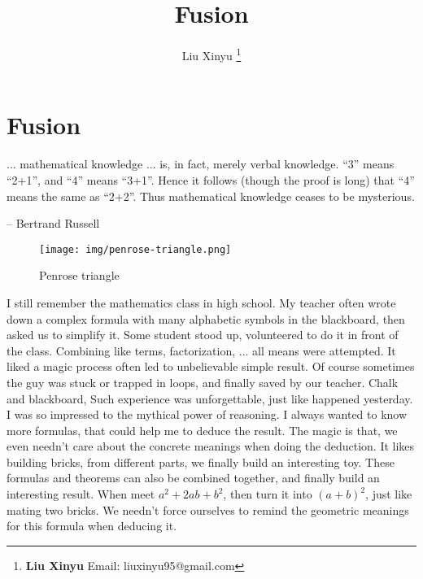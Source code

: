 \documentclass[b5paper]{article}
\begin{document}
\title{Fusion}

\author{Liu Xinyu
\thanks{{\bfseries Liu Xinyu} \newline
  Email: liuxinyu95@gmail.com \newline}
  }

\maketitle
\fi


\ifx\wholebook\relax
\chapter{Fusion}
\fi

\epigraph{... mathematical knowledge ... is, in fact, merely verbal knowledge. ``3'' means ``2+1'', and ``4'' means ``3+1''. Hence it follows (though the proof is long) that ``4'' means the same as ``2+2''. Thus mathematical knowledge ceases to be mysterious.}{-- Bertrand Russell}

\begin{wrapfigure}{R}{0.4\textwidth}
 \centering
 \texttt{[image: img/penrose-triangle.png]}
 \captionsetup{labelformat=empty}
 \caption{Penrose triangle}
 \label{fig:Penrose-triangle}
\end{wrapfigure}

I still remember the mathematics class in high school. My teacher often wrote down a complex formula with many alphabetic symbols in the blackboard, then asked us to simplify it. Some student stood up, volunteered to do it in front of the class. Combining like terms, factorization, ... all means were attempted. It liked a magic process often led to unbelievable simple result. Of course sometimes the guy was stuck or trapped in loops, and finally saved by our teacher. Chalk and blackboard, Such experience was unforgettable, just like happened yesterday. I was so impressed to the mythical power of reasoning. I always wanted to know more formulas, that could help me to deduce the result. The magic is that, we even needn't care about the concrete meanings when doing the deduction. It likes building bricks, from different parts, we finally build an interesting toy. These formulas and theorems can also be combined together, and finally build an interesting result. When meet $a^2 + 2ab + b^2$, then turn it into $(a+b)^2$, just like mating two bricks. We needn't force ourselves to remind the geometric meanings for this formula when deducing it.
\end{document}
